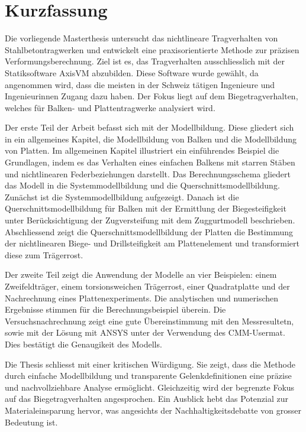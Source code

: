 \chapter*{Kurzfassung}

Die vorliegende Masterthesis untersucht das nichtlineare Tragverhalten von Stahlbetontragwerken und entwickelt eine praxisorientierte Methode zur präzisen Verformungsberechnung. Ziel ist es, das Tragverhalten ausschliesslich mit der Statiksoftware AxisVM abzubilden. Diese Software wurde gewählt, da angenommen wird, dass die meisten in der Schweiz tätigen Ingenieure und Ingenieurinnen Zugang dazu haben. Der Fokus liegt auf dem Biegetragverhalten, welches für Balken- und Plattentragwerke analysiert wird.

Der erste Teil der Arbeit befasst sich mit der Modellbildung. Diese gliedert sich in ein allgemeines Kapitel, die Modellbildung von Balken und die Modellbildung von Platten. Im allgemeinen Kapitel illustriert ein einführendes Beispiel die Grundlagen, indem es das Verhalten eines einfachen Balkens mit starren Stäben und nichtlinearen Federbeziehungen darstellt. Das Berechnungsschema gliedert das Modell in die Systemmodellbildung und die Querschnittsmodellbildung. Zunächst ist die Systemmodellbildung aufgezeigt. Danach ist die Querschnittsmodellbildung für Balken mit der Ermittlung der  Biegesteifigkeit unter Berücksichtigung der Zugversteifung mit dem Zuggurtmodell beschrieben. Abschliessend zeigt die Querschnittsmodellbildung der Platten die Bestimmung der nichtlinearen Biege- und Drillsteifigkeit am Plattenelement und transformiert diese zum Trägerrost.

Der zweite Teil zeigt die Anwendung der Modelle an vier Beispielen: einem Zweifeldträger, einem torsionsweichen Trägerrost, einer Quadratplatte und der Nachrechnung eines Plattenexperiments. Die analytischen und numerischen Ergebnisse stimmen für die Berechnungsbeispiel überein. Die Versuchsnachrechnung zeigt eine gute Übereinstimmung mit den Messresultetn, sowie mit der Lösung mit ANSYS unter der Verwendung des CMM-Usermat. Dies bestätigt die Genaugikeit des Modells.

Die Thesis schliesst mit einer kritischen Würdigung. Sie zeigt, dass die Methode durch einfache Modellbildung und transparente Gelenkdefinitionen eine präzise und nachvollziehbare Analyse ermöglicht. Gleichzeitig wird der begrenzte Fokus auf das Biegetragverhalten angesprochen. Ein Ausblick hebt das Potenzial zur Materialeinsparung hervor, was angesichts der Nachhaltigkeitsdebatte von grosser Bedeutung ist.